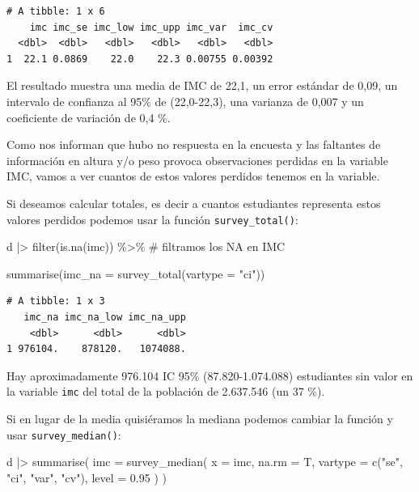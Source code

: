 \documentclass[
  spanish,
  a4paper,
]{scrbook}
\newenvironment{Shaded}{\begin{snugshade}}{\end{snugshade}}
\newcommand{\AttributeTok}[1]{\textcolor[rgb]{0.40,0.45,0.13}{#1}}
\newcommand{\CommentTok}[1]{\textcolor[rgb]{0.37,0.37,0.37}{#1}}
\newcommand{\FloatTok}[1]{\textcolor[rgb]{0.68,0.00,0.00}{#1}}
\newcommand{\FunctionTok}[1]{\textcolor[rgb]{0.28,0.35,0.67}{#1}}
\newcommand{\NormalTok}[1]{\textcolor[rgb]{0.00,0.23,0.31}{#1}}
\newcommand{\SpecialCharTok}[1]{\textcolor[rgb]{0.37,0.37,0.37}{#1}}
\newcommand{\StringTok}[1]{\textcolor[rgb]{0.13,0.47,0.30}{#1}}
\begin{document}
\begin{verbatim}
# A tibble: 1 x 6
    imc imc_se imc_low imc_upp imc_var  imc_cv
  <dbl>  <dbl>   <dbl>   <dbl>   <dbl>   <dbl>
1  22.1 0.0869    22.0    22.3 0.00755 0.00392
\end{verbatim}

El resultado muestra una media de IMC de 22,1, un error estándar de
0,09, un intervalo de confianza al 95\% de (22,0-22,3), una varianza de
0,007 y un coeficiente de variación de 0,4 \%.

Como nos informan que hubo no respuesta en la encuesta y las faltantes
de información en altura y/o peso provoca observaciones perdidas en la
variable IMC, vamos a ver cuantos de estos valores perdidos tenemos en
la variable.

Si deseamos calcular totales, es decir a cuantos estudiantes representa
estos valores perdidos podemos usar la función \texttt{survey\_total()}:

\begin{Shaded}
\begin{Highlighting}[]
\NormalTok{d }\SpecialCharTok{|\textgreater{}}
  \FunctionTok{filter}\NormalTok{(}\FunctionTok{is.na}\NormalTok{(imc)) }\SpecialCharTok{\%\textgreater{}\%} \CommentTok{\# filtramos los NA en IMC}

  \FunctionTok{summarise}\NormalTok{(}\AttributeTok{imc\_na =} \FunctionTok{survey\_total}\NormalTok{(}\AttributeTok{vartype =} \StringTok{"ci"}\NormalTok{))}
\end{Highlighting}
\end{Shaded}

\begin{verbatim}
# A tibble: 1 x 3
   imc_na imc_na_low imc_na_upp
    <dbl>      <dbl>      <dbl>
1 976104.    878120.   1074088.
\end{verbatim}

Hay aproximadamente 976.104 IC 95\% (87.820-1.074.088) estudiantes sin
valor en la variable \texttt{imc} del total de la población de 2.637.546
(un 37 \%).

Si en lugar de la media quisiéramos la mediana podemos cambiar la
función y usar \texttt{survey\_median()}:

\begin{Shaded}
\begin{Highlighting}[]
\NormalTok{d }\SpecialCharTok{|\textgreater{}}
  \FunctionTok{summarise}\NormalTok{(}
    \AttributeTok{imc =} \FunctionTok{survey\_median}\NormalTok{(}
      \AttributeTok{x =}\NormalTok{ imc,}
      \AttributeTok{na.rm =}\NormalTok{ T,}
      \AttributeTok{vartype =} \FunctionTok{c}\NormalTok{(}\StringTok{"se"}\NormalTok{, }\StringTok{"ci"}\NormalTok{, }\StringTok{"var"}\NormalTok{, }\StringTok{"cv"}\NormalTok{),}
      \AttributeTok{level =} \FloatTok{0.95}
\NormalTok{    )}
\NormalTok{  )}
\end{Highlighting}
\end{Shaded}
\end{document}
